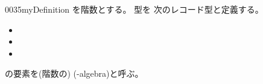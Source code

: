 \documentclass[index]{subfiles}
\begin{document}
\begin{myBlock}{0035}{myDefinition}
  を階数とする。
  型を
  次のレコード型と定義する。
  \begin{itemize}
  \item {}
  \item \myInlineMath{\myNatAlgZero \myElemOf \myNatAlgCarrier}
  \item \myInlineMath{\myNatAlgSucc \myElemOf
    \myNatAlgCarrier \myFunType \myNatAlgCarrier}
\end{itemize}
の要素を(階数の)
(\myInlineMath{\myNat}-algebra)と呼ぶ。
\end{myBlock}
\end{document}
